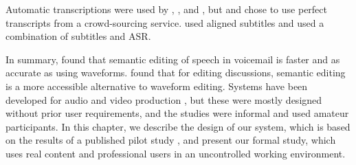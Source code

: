 Automatic transcriptions were used by \citet{Whittaker2004}, \citet{Sivaraman2016}, \citet{Shin2016} and
\citet{Yoon2014}, but \citet{Berthouzoz2012} and \citet{Rubin2013} chose to use perfect transcripts from a
crowd-sourcing service.  \citet{Hyperaudio2016} used aligned subtitles and \citet{Casares2002} used a combination of
subtitles and ASR.

In summary, \citet{Whittaker2004} found that semantic editing of speech in voicemail is faster and as accurate as using
waveforms.  \citet{Sivaraman2016} found that for editing discussions, semantic editing is a more accessible alternative
to waveform editing. Systems have been developed for audio and video production
\citep{Casares2002,Berthouzoz2012,Rubin2013,Shin2016}, but these were mostly designed without prior user requirements,
and the studies were informal and used amateur participants. In this chapter, we describe the design of our system, which
is based on the results of a published pilot study \citep{Baume2015}, and present our formal study, which uses real
content and professional users in an uncontrolled working environment.










